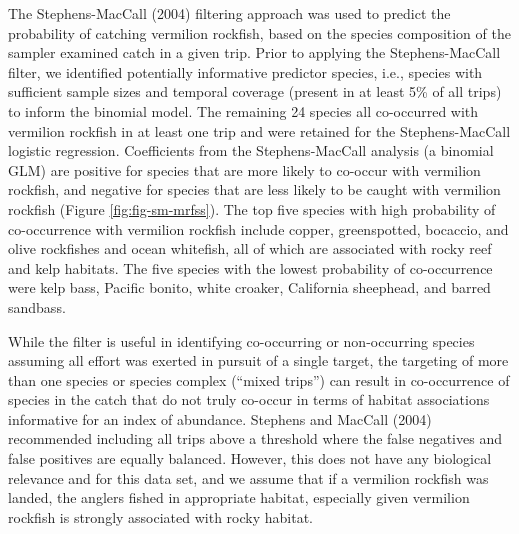 \documentclass[11pt,
  english,
]{article}
\begin{document}
The Stephens-MacCall {(2004)\leavevmode\tagmcend\tagstructend} filtering approach was used to predict the probability of catching vermilion rockfish, based on the species composition of the sampler examined catch in a given trip. Prior to applying the Stephens-MacCall filter, we identified potentially informative predictor species, i.e., species with sufficient sample sizes and temporal coverage (present in at least 5\% of all trips) to inform the binomial model. The remaining 24 species all co-occurred with vermilion rockfish in at least one trip and were retained for the Stephens-MacCall logistic regression. Coefficients from the Stephens-MacCall analysis (a binomial GLM) are positive for species that are more likely to co-occur with vermilion rockfish, and negative for species that are less likely to be caught with vermilion rockfish (Figure \ref{fig:fig-sm-mrfss}). The top five species with high probability of co-occurrence with vermilion rockfish include copper, greenspotted, bocaccio, and olive rockfishes and ocean whitefish, all of which are associated with rocky reef and kelp habitats. The five species with the lowest probability of co-occurrence were kelp bass, Pacific bonito, white croaker, California sheephead, and barred sandbass.

While the filter is useful in identifying co-occurring or non-occurring species assuming all effort was exerted in pursuit of a single target, the targeting of more than one species or species complex (``mixed trips'') can result in co-occurrence of species in the catch that do not truly co-occur in terms of habitat associations informative for an index of abundance. Stephens and MacCall {(2004)\leavevmode\tagmcend\tagstructend} recommended including all trips above a threshold where the false negatives and false positives are equally balanced. However, this does not have any biological relevance and for this data set, and we assume that if a vermilion rockfish was landed, the anglers fished in appropriate habitat, especially given vermilion rockfish is strongly associated with rocky habitat.
\end{document}
